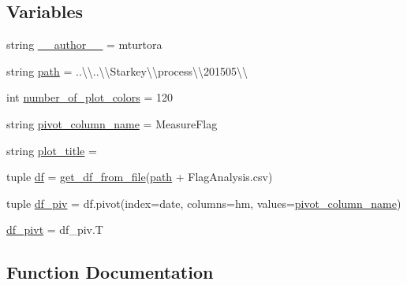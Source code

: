 \subsection*{Variables}
\begin{DoxyCompactItemize}
\item 
string \hyperlink{namespace_flag_analysis_a7b5b76152f5c421daf3fbdae1ee42ec5}{\+\_\+\+\_\+author\+\_\+\+\_\+} = \textquotesingle{}mturtora\textquotesingle{}
\item 
string \hyperlink{namespace_flag_analysis_a479e7d01bc47b2c854b2f33d7d8b2719}{path} = \textquotesingle{}..\textbackslash{}\textbackslash{}..\textbackslash{}\textbackslash{}Starkey\textbackslash{}\textbackslash{}process\textbackslash{}\textbackslash{}201505\textbackslash{}\textbackslash{}\textquotesingle{}
\item 
int \hyperlink{namespace_flag_analysis_a2580a0126198e57e3b911e2e9005ce1e}{number\+\_\+of\+\_\+plot\+\_\+colors} = 120
\item 
string \hyperlink{namespace_flag_analysis_a39d797833bc2634e7f4c497cf090bc66}{pivot\+\_\+column\+\_\+name} = \textquotesingle{}Measure\+Flag\textquotesingle{}
\item 
string \hyperlink{namespace_flag_analysis_abd038dc9d4b0dae57d6f4ba4218b8f3a}{plot\+\_\+title} = \textquotesingle{} \textquotesingle{}
\item 
tuple \hyperlink{namespace_flag_analysis_ae8822b0eb9daec5247dbcf50515f9809}{df} = \hyperlink{namespace_flag_analysis_aea67ad62c26ead387c02331695c812a1}{get\+\_\+df\+\_\+from\+\_\+file}(\hyperlink{namespace_flag_analysis_a479e7d01bc47b2c854b2f33d7d8b2719}{path} + \textquotesingle{}Flag\+Analysis.\+csv\textquotesingle{})
\item 
tuple \hyperlink{namespace_flag_analysis_ae886d6e98de0bb5bb5a83e12ed72b924}{df\+\_\+piv} = df.\+pivot(index=\textquotesingle{}date\textquotesingle{}, columns=\textquotesingle{}hm\textquotesingle{}, values=\hyperlink{namespace_flag_analysis_a39d797833bc2634e7f4c497cf090bc66}{pivot\+\_\+column\+\_\+name})
\item 
\hyperlink{namespace_flag_analysis_a71e45af7a483a1647c8609f98d8b959e}{df\+\_\+pivt} = df\+\_\+piv.\+T
\end{DoxyCompactItemize}


\subsection{Function Documentation}
\hypertarget{namespace_flag_analysis_a4ef4afc0d129e509db5b4e87e7f89520}{}
